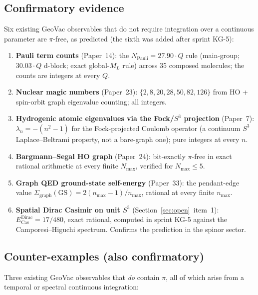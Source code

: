 \documentclass[11pt]{article}
\begin{document}
\subsection{Confirmatory evidence}

Six existing GeoVac observables that do not require integration over a
continuous parameter are $\pi$-free, as predicted (the sixth was added
after sprint KG-5):

\begin{enumerate}
\setlength\itemsep{0pt}
\item \textbf{Pauli term counts} (Paper~14): the $N_\text{Pauli}
= 27.90 \cdot Q$ rule (main-group; $30.03 \cdot Q$ d-block; exact
global-$M_L$ rule) across 35 composed molecules; the counts are integers
at every $Q$.
\item \textbf{Nuclear magic numbers} (Paper~23): $\{2, 8, 20, 28, 50,
82, 126\}$ from HO + spin-orbit graph eigenvalue counting; all integers.
\item \textbf{Hydrogenic atomic eigenvalues via the Fock/$S^3$ projection}
(Paper~7): $\lambda_n = -(n^2 - 1)$ for the Fock-projected Coulomb
operator (a continuum $S^3$ Laplace--Beltrami property, not a bare-graph
one); pure integers at every $n$.
\item \textbf{Bargmann--Segal HO graph} (Paper~24): bit-exactly
$\pi$-free in exact rational arithmetic at every finite $N_\text{max}$,
verified for $N_\text{max} \leq 5$.
\item \textbf{Graph QED ground-state self-energy} (Paper~33): the
pendant-edge value $\Sigma_{\mathrm{graph}}(\mathrm{GS}) =
2(n_\text{max}-1)/n_\text{max}$, rational at every finite $n_\text{max}$.
\item \textbf{Spatial Dirac Casimir on unit $S^3$} (Section~\ref{sec:open}~item~1):
$E^{\text{Dirac}}_\text{Cas} = 17/480$, exact rational, computed in
sprint KG-5 against the Camporesi--Higuchi spectrum.  Confirms the
prediction in the spinor sector.
\end{enumerate}

\subsection{Counter-examples (also confirmatory)}

Three existing GeoVac observables that \emph{do} contain $\pi$, all of
which arise from a temporal or spectral continuous integration:
\end{document}
